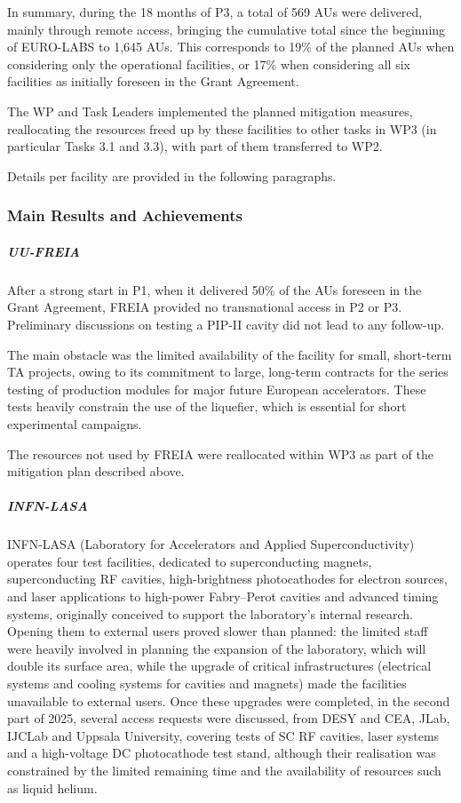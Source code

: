 In summary, during the 18 months of P3, a total of 569 AUs were delivered, mainly through remote access, bringing the cumulative total since the beginning of EURO-LABS to 1,645 AUs. This corresponds to 19\% of the planned AUs when considering only the operational facilities, or 17\% when considering all six facilities as initially foreseen in the Grant Agreement.

The WP and Task Leaders implemented the planned mitigation measures, reallocating the resources freed up by these facilities to other tasks in WP3 (in particular Tasks 3.1 and 3.3), with part of them transferred to WP2.

Details per facility are provided in the following paragraphs.

\subsubsection*{Main Results and Achievements}


\subparagraph{UU-FREIA} \mbox{}

After a strong start in P1, when it delivered 50\% of the AUs foreseen in the Grant Agreement, FREIA provided no transnational access in P2 or P3. Preliminary discussions on testing a PIP-II cavity did not lead to any follow-up.

The main obstacle was the limited availability of the facility for small, short-term TA projects, owing to its commitment to large, long-term contracts for the series testing of production modules for major future European accelerators. These tests heavily constrain the use of the liquefier, which is essential for short experimental campaigns. 

The resources not used by FREIA were reallocated within WP3 as part of the mitigation plan described above.

\subparagraph{INFN-LASA} \mbox{}

INFN-LASA (Laboratory for Accelerators and Applied Superconductivity) operates four test facilities, dedicated to superconducting magnets, superconducting RF cavities, high-brightness photocathodes for electron sources, and laser applications to high-power Fabry--Perot cavities and advanced timing systems, originally conceived to support the laboratory's internal research. Opening them to external users proved slower than planned: the limited staff were heavily involved in planning the expansion of the laboratory, which will double its surface area, while the upgrade of critical infrastructures (electrical systems and cooling systems for cavities and magnets) made the facilities unavailable to external users. Once these upgrades were completed, in the second part of 2025, several access requests were discussed, from DESY and CEA, JLab, IJCLab and Uppsala University, covering tests of SC RF cavities, laser systems and a high-voltage DC photocathode test stand, although their realisation was constrained by the limited remaining time and the availability of resources such as liquid helium.

